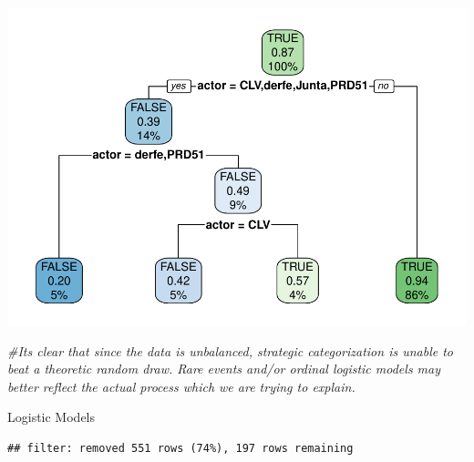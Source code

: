 \documentclass[]{article}
\newenvironment{Shaded}{\begin{snugshade}}{\end{snugshade}}
\newcommand{\CommentTok}[1]{\textcolor[rgb]{0.56,0.35,0.01}{\textit{#1}}}
\newcommand{\DataTypeTok}[1]{\textcolor[rgb]{0.13,0.29,0.53}{#1}}
\newcommand{\FloatTok}[1]{\textcolor[rgb]{0.00,0.00,0.81}{#1}}
\newcommand{\KeywordTok}[1]{\textcolor[rgb]{0.13,0.29,0.53}{\textbf{#1}}}
\newcommand{\NormalTok}[1]{#1}
\newcommand{\OperatorTok}[1]{\textcolor[rgb]{0.81,0.36,0.00}{\textbf{#1}}}
\newcommand{\StringTok}[1]{\textcolor[rgb]{0.31,0.60,0.02}{#1}}
\begin{document}
\includegraphics{ProposalAnalysis_files/figure-latex/unnamed-chunk-10-1.pdf}

\begin{Shaded}
\begin{Highlighting}[]
\CommentTok{#Its clear that since the data is unbalanced, strategic categorization is unable to beat a theoretic random draw. Rare events and/or ordinal logistic models may better reflect the actual process which we are trying to explain.}
\end{Highlighting}
\end{Shaded}

Logistic Models

\begin{Shaded}
\end{Shaded}

\begin{verbatim}
## filter: removed 551 rows (74%), 197 rows remaining
\end{verbatim}

\begin{Shaded}
\end{Shaded}
\end{document}
